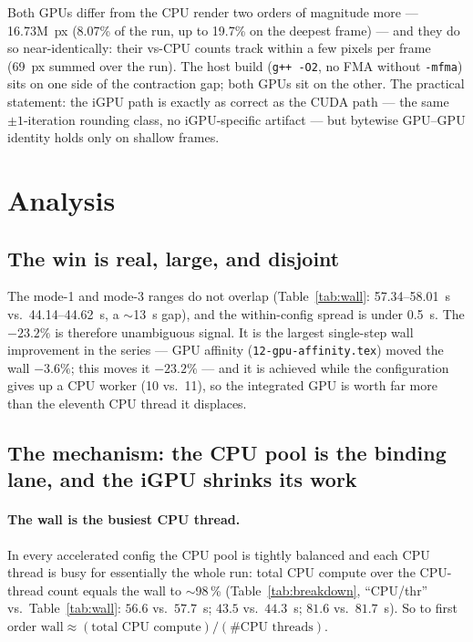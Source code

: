 \documentclass[
	english,
	letterpaper, oneside
]{article}
\begin{document}
Both GPUs differ from the CPU render two orders of magnitude more ---
16.73M~px (8.07\% of the run, up to 19.7\% on the deepest frame) --- and
they do so near-identically: their vs-CPU counts track within a few pixels per
frame (69~px summed over the run). The host build (\texttt{g++ -O2}, no FMA
without \texttt{-mfma}) sits on one side of the contraction gap; both GPUs sit on
the other. The practical statement: the iGPU path is exactly as correct as
the CUDA path --- the same $\pm1$-iteration rounding class, no iGPU-specific
artifact --- but bytewise GPU--GPU identity holds only on shallow frames.

\section{Analysis}

\subsection{The win is real, large, and disjoint}

The mode-1 and mode-3 ranges do not overlap (Table~\ref{tab:wall}: 57.34--58.01~s
vs.\ 44.14--44.62~s, a $\sim$13~s gap), and the within-config spread is under
0.5~s. The $-23.2\%$ is therefore unambiguous signal. It is the largest single-step
wall improvement in the series --- GPU affinity (\texttt{12-gpu-affinity.tex}) moved
the wall $-3.6\%$; this moves it $-23.2\%$ --- and it is achieved while the
configuration gives up a CPU worker (10 vs.\ 11), so the integrated GPU is
worth far more than the eleventh CPU thread it displaces.

\subsection{The mechanism: the CPU pool is the binding lane, and the iGPU shrinks its work}

\paragraph{The wall is the busiest CPU thread.} In every accelerated config the
CPU pool is tightly balanced and each CPU thread is busy for essentially the whole
run: total CPU compute over the CPU-thread count equals the wall to $\sim$98\,\%
(Table~\ref{tab:breakdown}, ``CPU/thr'' vs.\ Table~\ref{tab:wall}: $56.6$ vs.\
$57.7$~s; $43.5$ vs.\ $44.3$~s; $81.6$ vs.\ $81.7$~s). So to first order
$\text{wall} \approx (\text{total CPU compute}) / (\text{\#CPU threads})$.
\end{document}
